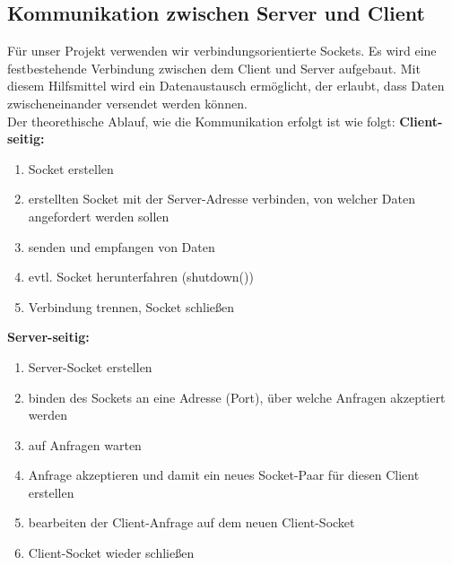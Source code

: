 \documentclass{scrartcl}
\begin{document}
	\subsection{Kommunikation zwischen Server und Client}
		Für unser Projekt verwenden wir verbindungsorientierte Sockets. Es wird eine festbestehende Verbindung zwischen dem Client und Server aufgebaut. Mit diesem Hilfsmittel wird ein Datenaustausch ermöglicht, der erlaubt, dass Daten zwischeneinander versendet werden können.\\
		Der theorethische Ablauf, wie die Kommunikation erfolgt ist wie folgt:
		\textbf{Client-seitig:}
		\begin{enumerate}
			\item Socket erstellen
			\item erstellten Socket mit der Server-Adresse verbinden, von welcher Daten angefordert werden sollen
			\item senden und empfangen von Daten
			\item evtl. Socket herunterfahren (shutdown())
			\item Verbindung trennen, Socket schließen
		\end{enumerate}
		
		\textbf{Server-seitig:}
		\begin{enumerate}
			\item Server-Socket erstellen
			\item binden des Sockets an eine Adresse (Port), über welche Anfragen akzeptiert werden
			\item auf Anfragen warten
			\item Anfrage akzeptieren und damit ein neues Socket-Paar für diesen Client erstellen
			\item bearbeiten der Client-Anfrage auf dem neuen Client-Socket
			\item Client-Socket wieder schließen
		\end{enumerate}
\end{document}
